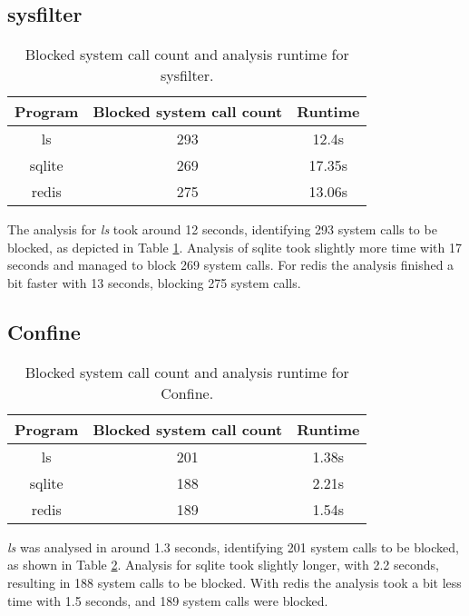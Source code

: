\subsection {sysfilter}
\begin{table}[!h]
\begin{center}
\caption{Blocked system call count and analysis runtime for sysfilter.}
\label{tbl:sysfilter_results}
\begin{tabular}{||c c c||} 
 \hline
 Program & Blocked system call count & Runtime \\
 \hline\hline
 ls & 293 & 12.4s \\ 
 \hline
 sqlite & 269 & 17.35s \\ 
 \hline
 redis & 275 & 13.06s \\ 
 \hline
\end{tabular}
\end{center}
\end{table}
The analysis for \textit{ls} took around 12 seconds, identifying 293 system calls to be blocked, as depicted in Table \ref{tbl:sysfilter_results}.
Analysis of sqlite took slightly more time with 17 seconds and managed to block 269 system calls.
For redis the analysis finished a bit faster with 13 seconds, blocking 275 system calls.

\subsection {Confine}
\begin{table}[!h]
\begin{center}
\caption{Blocked system call count and analysis runtime for Confine.}
\label{tbl:confine_results}
\begin{tabular}{||c c c||} 
 \hline
 Program & Blocked system call count & Runtime \\
 \hline\hline
 ls & 201 & 1.38s \\ 
 \hline
 sqlite & 188 & 2.21s \\ 
 \hline
 redis & 189 & 1.54s \\ 
 \hline
\end{tabular}
\end{center}
\end{table}
\textit{ls} was analysed in around 1.3 seconds, identifying 201 system calls to be blocked, as shown in Table \ref{tbl:confine_results}.
Analysis for sqlite took slightly longer, with 2.2 seconds, resulting in 188 system calls to be blocked.
With redis the analysis took a bit less time with 1.5 seconds, and 189 system calls were blocked.

